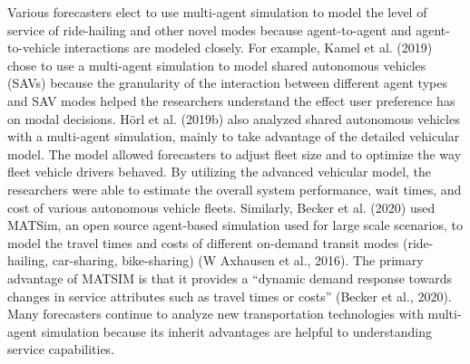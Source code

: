 \documentclass[simple, masters, twoside]{byuthesis}
\begin{document}
Various forecasters elect to use multi-agent simulation to model the level of service of ride-hailing and other novel modes because agent-to-agent and agent-to-vehicle interactions are modeled closely. For example, Kamel et al. (2019) chose to use a multi-agent simulation to model shared autonomous vehicles (SAVs) because the granularity of the interaction between different agent types and SAV modes helped the researchers understand the effect user preference has on modal decisions. Hörl et al. (2019b) also analyzed shared autonomous vehicles with a multi-agent simulation, mainly to take advantage of the detailed vehicular model. The model allowed forecasters to adjust fleet size and to optimize the way fleet vehicle drivers behaved. By utilizing the advanced vehicular model, the researchers were able to estimate the overall system performance, wait times, and cost of various autonomous vehicle fleets. Similarly, Becker et al. (2020) used MATSim, an open source agent-based simulation used for large scale scenarios, to model the travel times and costs of different on-demand transit modes (ride-hailing, car-sharing, bike-sharing) (W Axhausen et al., 2016). The primary advantage of MATSIM is that it provides a ``dynamic demand response towards changes in service attributes such as travel times or costs'' (Becker et al., 2020). Many forecasters continue to analyze new transportation technologies with multi-agent simulation because its inherit advantages are helpful to understanding service capabilities.
\end{document}
